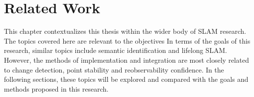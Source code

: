 \section{Related Work}
\label{sec:related_work}

This chapter contextualizes this thesis within the wider body of SLAM research. The topics covered here are relevant to the objectives 
In terms of the goals of this research, similar topics include semantic identification and lifelong SLAM. However, the methods of implementation and integration are most closely related to change detection, point stability and reobservability confidence. In the following sections, these topics will be explored and compared with the goals and methods proposed in this research.

% 
